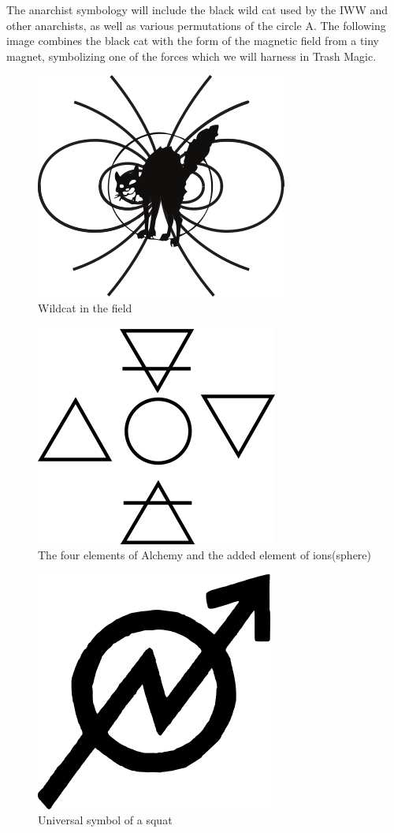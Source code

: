 The anarchist symbology will include the black wild cat used by the IWW
and other anarchists, as well as various permutations of the circle A.
The following image combines the black cat with the form of the magnetic
field from a tiny magnet, symbolizing one of the forces which we will
harness in Trash Magic.

\begin{figure}[htbp]
\centering
\includegraphics{images/cat3.png}
\caption{Wildcat in the field}
\end{figure}

\begin{figure}[htbp]
\centering
\includegraphics{images/elements.png}
\caption{The four elements of Alchemy and the added element of
ions(sphere)}
\end{figure}

\begin{figure}[htbp]
\centering
\includegraphics{images/squat.png}
\caption{Universal symbol of a squat}
\end{figure}

